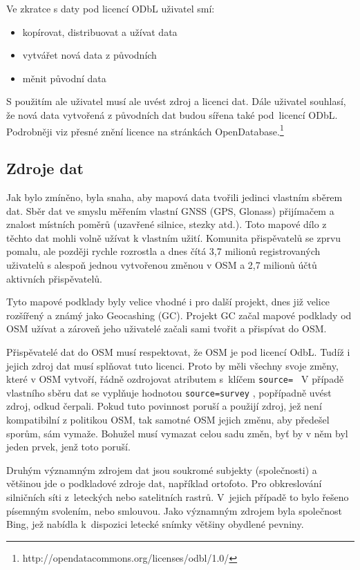 Ve zkratce s daty pod licencí ODbL uživatel smí:
\begin{itemize}
    \item    kopírovat, distribuovat a užívat data
    \item    vytvářet nová data z původních
    \item    měnit původní data
\end{itemize}

S použitím ale uživatel musí ale uvést zdroj a licenci dat.
Dále uživatel souhlasí, že nová data vytvořená z původních dat budou sířena
také pod~licencí ODbL.
Podrobněji viz přesné znění licence na stránkách OpenDatabase.\footnote{http://opendatacommons.org/licenses/odbl/1.0/}


\subsection{Zdroje dat}
\label{Zdroje dat}

Jak bylo zmíněno, byla snaha, aby mapová data tvořili jedinci vlastním
sběrem dat. Sběr dat ve smyslu měřením vlastní GNSS (GPS, Glonass)
přijímačem a znalost místních poměrů (uzavřené silnice, stezky atd.).
Toto mapové dílo z těchto dat mohli volně užívat k vlastním užití.
Komunita přispěvatelů se zprvu pomalu, ale později rychle rozrostla a
dnes čítá 3,7 milionů registrovaných uživatelů s alespoň jednou
vytvořenou změnou v OSM a 2,7 milionů účtů aktivních přispěvatelů.\cite{OSMstats}

Tyto mapové podklady byly velice vhodné i pro další projekt, dnes již
velice rozšířený a známý jako Geocashing (GC). Projekt GC začal mapové
podklady od OSM užívat a zároveň jeho uživatelé začali sami tvořit a
přispívat do OSM. 

Přispěvatelé dat do OSM musí respektovat, že OSM je pod licencí OdbL.
Tudíž i jejich zdroj dat musí splňovat tuto licenci. Proto by měli
všechny svoje změny, které v OSM vytvoří, řádně ozdrojovat atributem
s~klíčem 
{\tt source= }
V případě vlastního sběru dat se vyplňuje hodnotou
{\tt source=survey} ,
popřípadně uvést zdroj, odkud čerpali. Pokud tuto povinnost poruší a
použijí zdroj, jež není kompatibilní z politikou OSM, tak samotné OSM
jejich změnu, aby předešel sporům, sám vymaže. Bohužel musí vymazat
celou sadu změn, byť by v něm byl jeden prvek, jenž toto poruší.

Druhým významným zdrojem dat jsou soukromé subjekty (společnosti) a
většinou jde o podkladové zdroje dat, například ortofoto. Pro obkreslování
silničních síti z~leteckých nebo satelitních rastrů. V~jejich případě to
bylo řešeno písemným svolením, nebo smlouvou. Jako významným zdrojem byla
společnost Bing, jež nabídla k~dispozici letecké snímky většiny
obydlené pevniny. 

